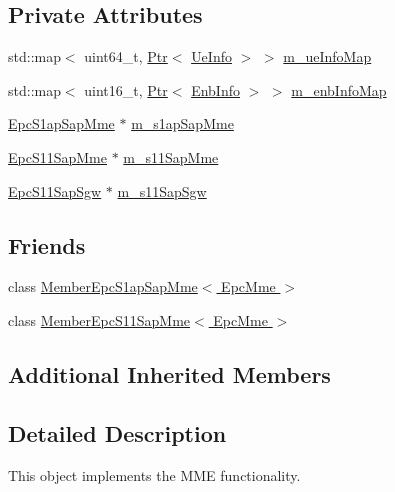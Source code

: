 \subsection*{Private Attributes}
\begin{DoxyCompactItemize}
\item 
std\+::map$<$ uint64\+\_\+t, \hyperlink{classns3_1_1Ptr}{Ptr}$<$ \hyperlink{structns3_1_1EpcMme_1_1UeInfo}{Ue\+Info} $>$ $>$ \hyperlink{classns3_1_1EpcMme_a4de6ccff4d63d5ecd08774d2517e04fc}{m\+\_\+ue\+Info\+Map}
\item 
std\+::map$<$ uint16\+\_\+t, \hyperlink{classns3_1_1Ptr}{Ptr}$<$ \hyperlink{structns3_1_1EpcMme_1_1EnbInfo}{Enb\+Info} $>$ $>$ \hyperlink{classns3_1_1EpcMme_aa85cebd9464b0f85b9cf84560e505592}{m\+\_\+enb\+Info\+Map}
\item 
\hyperlink{classns3_1_1EpcS1apSapMme}{Epc\+S1ap\+Sap\+Mme} $\ast$ \hyperlink{classns3_1_1EpcMme_a951fa9aae8e8467c84a477b5d8702216}{m\+\_\+s1ap\+Sap\+Mme}
\item 
\hyperlink{classns3_1_1EpcS11SapMme}{Epc\+S11\+Sap\+Mme} $\ast$ \hyperlink{classns3_1_1EpcMme_a9bbf1cf43f42b68a1ebdf94ec6c5f3b1}{m\+\_\+s11\+Sap\+Mme}
\item 
\hyperlink{classns3_1_1EpcS11SapSgw}{Epc\+S11\+Sap\+Sgw} $\ast$ \hyperlink{classns3_1_1EpcMme_a2a7e19d22b289ecd9f26f5602129fa5e}{m\+\_\+s11\+Sap\+Sgw}
\end{DoxyCompactItemize}
\subsection*{Friends}
\begin{DoxyCompactItemize}
\item 
class \hyperlink{classns3_1_1EpcMme_a5c1dde3f4094008de4b546daa916cc39}{Member\+Epc\+S1ap\+Sap\+Mme$<$ Epc\+Mme $>$}
\item 
class \hyperlink{classns3_1_1EpcMme_a3011c60c04489538ec0f2ff0ca274f94}{Member\+Epc\+S11\+Sap\+Mme$<$ Epc\+Mme $>$}
\end{DoxyCompactItemize}
\subsection*{Additional Inherited Members}


\subsection{Detailed Description}
This object implements the M\+ME functionality. 

